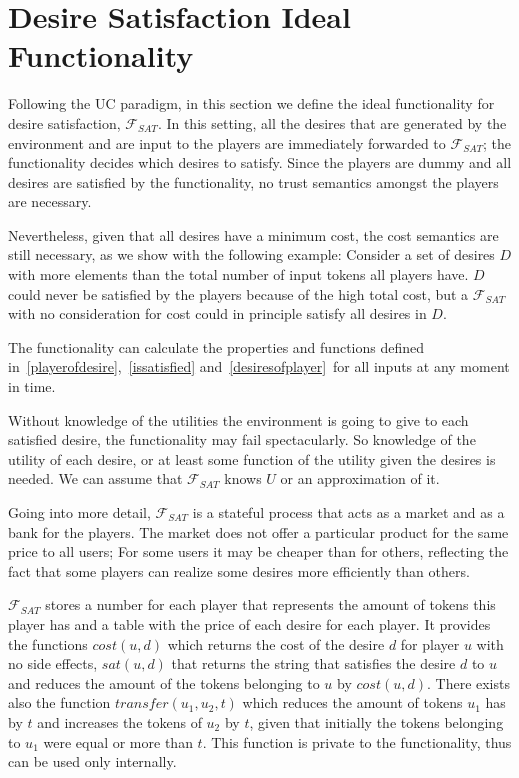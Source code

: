 \section{Desire Satisfaction Ideal Functionality}
  Following the UC paradigm, in this section we define the ideal functionality for desire satisfaction, $\mathcal{F}_{SAT}$.
  In this setting, all the desires that are generated by the environment and are input to the players are immediately forwarded
  to $\mathcal{F}_{SAT}$; the functionality decides which desires to satisfy. Since the players are dummy and all desires are
  satisfied by the functionality, no trust semantics amongst the players are necessary.
  
  Nevertheless, given that all desires have a minimum cost, the cost semantics are still necessary, as we show with the
  following example: Consider a set of desires $D$ with more elements than the total number of input tokens all players have.
  $D$ could never be satisfied by the players because of the high total cost, but a $\mathcal{F}_{SAT}$ with no consideration
  for cost could in principle satisfy all desires in $D$.

  The functionality can calculate the properties and functions defined in~\ref{playerofdesire},~\ref{issatisfied}
  and~\ref{desiresofplayer}\ for all inputs at any moment in time.

  Without knowledge of the utilities the environment is going to give to each satisfied desire, the functionality may fail
  spectacularly. So knowledge of the utility of each desire, or at least some function of the utility given the desires is
  needed. We can assume that $\mathcal{F}_{SAT}$ knows $U$ or an approximation of it.

  Going into more detail, $\mathcal{F}_{SAT}$ is a stateful process that acts as a market and as a bank for the players. The
  market does not offer a particular product for the same price to all users; For some users it may be cheaper than for others,
  reflecting the fact that some players can realize some desires more efficiently than others.

  $\mathcal{F}_{SAT}$ stores a number for each player that represents the amount of tokens this player has and a table with the
  price of each desire for each player. It provides the functions $cost\left(u, d\right)$ which returns the cost of the desire
  $d$ for player $u$ with no side effects, $sat\left(u, d\right)$ that returns the string that satisfies the desire $d$ to $u$
  and reduces the amount of the tokens belonging to $u$ by $cost\left(u, d\right)$. There exists also the function
  $transfer\left(u_1, u_2, t\right)$ which reduces the amount of tokens $u_1$ has by $t$ and increases the tokens of $u_2$ by
  $t$, given that initially the tokens belonging to $u_1$ were equal or more than $t$. This function is private to the
  functionality, thus can be used only internally.
